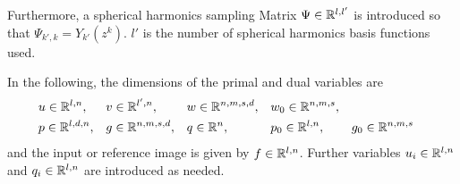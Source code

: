 Furthermore, a spherical harmonics sampling Matrix $\Psi \in \mathbb{R}^{l,l'}$ is
introduced so that $\Psi_{k',k} = Y_{k'}(z^k)$.
$l'$ is the number of spherical harmonics basis functions used.

In the following, the dimensions of the primal and dual variables are 
\begin{align*}
    & u \in \mathbb{R}^{l,n}, && v \in \mathbb{R}^{l',n}, && w \in \mathbb{R}^{n,m,s,d}, && w_0 \in \mathbb{R}^{n,m,s}, \\
    & p \in \mathbb{R}^{l,d,n}, && g \in \mathbb{R}^{n,m,s,d}, && q \in \mathbb{R}^{n},
        && p_0 \in \mathbb{R}^{l,n}, && g_0 \in \mathbb{R}^{n,m,s}
\end{align*}
and the input or reference image is given by $f \in \mathbb{R}^{l,n}$.
Further variables $u_i \in \mathbb{R}^{l,n}$ and $q_i \in \mathbb{R}^{l,n}$ are introduced
as needed.
